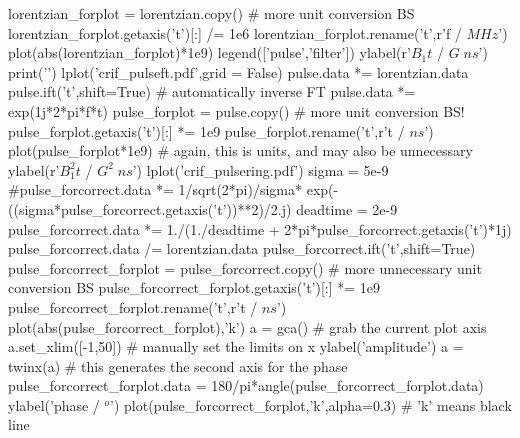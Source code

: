 \begin{python}
lorentzian_forplot = lorentzian.copy()
# more unit conversion BS
lorentzian_forplot.getaxis('t')[:] /= 1e6
lorentzian_forplot.rename('t',r'f / $MHz$')
plot(abs(lorentzian_forplot)*1e9)
legend(['pulse','filter'])
ylabel(r'$B_1 t$ / $G\;ns$')
print('\n\n')
lplot('crif_pulseft.pdf',grid = False)
pulse.data *= lorentzian.data
pulse.ift('t',shift=True) # automatically inverse FT
pulse.data *= exp(1j*2*pi*f*t)
pulse_forplot = pulse.copy()
# more unit conversion BS!
pulse_forplot.getaxis('t')[:] *= 1e9
pulse_forplot.rename('t',r't / $ns$')
plot(pulse_forplot*1e9)
# again, this is units, and may also be unnecessary
ylabel(r'$B_1^2 t$ / $G^2\;ns$')
lplot('crif_pulsering.pdf')
sigma = 5e-9
#pulse_forcorrect.data *= 1/sqrt(2*pi)/sigma* exp(-((sigma*pulse_forcorrect.getaxis('t'))**2)/2.j)
deadtime = 2e-9
pulse_forcorrect.data *= 1./(1./deadtime + 2*pi*pulse_forcorrect.getaxis('t')*1j)
pulse_forcorrect.data /= lorentzian.data
pulse_forcorrect.ift('t',shift=True)
pulse_forcorrect_forplot = pulse_forcorrect.copy()
# more unnecessary unit conversion BS
pulse_forcorrect_forplot.getaxis('t')[:] *= 1e9
pulse_forcorrect_forplot.rename('t',r't / $ns$')
plot(abs(pulse_forcorrect_forplot),'k')
a = gca() # grab the current plot axis
a.set_xlim([-1,50]) # manually set the limits on x
ylabel('amplitude')
a = twinx(a) # this generates the second axis for the phase
pulse_forcorrect_forplot.data = 180/pi*angle(pulse_forcorrect_forplot.data)
ylabel('phase / $^o$')
plot(pulse_forcorrect_forplot,'k',alpha=0.3) # 'k' means black line

\end{python}

